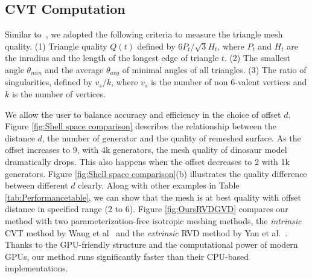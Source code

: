 \vspace{-0.5cm}
\subsection{CVT Computation}
\label{sec:results_CVT}
  Similar to~\cite{DBLP:journals/cad/WangYLXWGM015}, we adopted the following criteria to measure the triangle mesh quality.
  (1) Triangle quality $Q(t)$ defined by ${6P_{t}}/{\sqrt{3}H_{t}}$, where $P_t$ and $H_t$ are the inradius and the length of the longest edge of triangle $t$.
  (2) The smallest angle $\theta _{min}$ and the average $\theta _{avg}$ of minimal angles of all triangles.
  (3) The ratio of singularities, defined by $v_s / k$, where $v_s$ is the number of non 6-valent vertices and $k$ is the number of vertices.

   We allow the user to balance accuracy and efficiency in the choice of offset $d$.
   Figure \ref{fig:Shell space comparison} describes the relationship between the distance $d$, the number of generator and the quality of remeshed surface.
   As the offset increases to $9$, with 4k generators, the mesh quality of dinosaur model dramatically drops.
   This also happens when the offset decreases to $2$ with 1k generators.
   Figure \ref{fig:Shell space comparison}(b) illustrates the quality difference between different $d$ clearly.
   Along with other examples in Table \ref{tab:Performancetable}, we can show that the mesh is at best quality with offset distance in specified range (2 to 6).
   Figure \ref{fig:OursRVDGVD} compares our method with two parameterization-free isotropic meshing methods,
   the \textit{intrinsic} CVT method by Wang et al~\cite{DBLP:journals/cad/WangYLXWGM015}
   and the \textit{extrinsic} RVD method by Yan et al.~\cite{DBLP:journals/cgf/YanLLSW09}.
   Thanks to the GPU-friendly structure and the computational power of modern GPUs,
   our method runs significantly faster than their CPU-based implementations.

